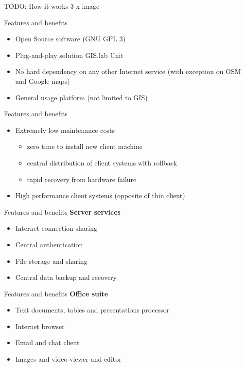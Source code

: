 \documentclass[12pt]{beamer}
\begin{document}
\begin{frame}
	TODO: How it works 3 x image
\end{frame}


\begin{frame}{Features and benefits}
	\begin{itemize}
		\item Open Source software (GNU GPL 3)
		\item Plug-and-play solution GIS.lab Unit
		\item No hard dependency on any other Internet service (with exception on OSM and Google maps)
		\item General usage platform (not limited to GIS)
	\end{itemize}
\end{frame}


\begin{frame}{Features and benefits}
	\begin{itemize}
		\item Extremely low maintenance costs
		\begin{itemize}
			\item zero time to install new client machine
			\item central distribution of client systems with rollback
			\item rapid recovery from hardware failure
		\end{itemize}
		\item High performance client systems (opposite of thin client)
	\end{itemize}
\end{frame}


\begin{frame}{Features and benefits}
	\textbf{Server services}
	\begin{itemize}
		\item Internet connection sharing
		\item Central authentication
		\item File storage and sharing
		\item Central data backup and recovery
	\end{itemize}
\end{frame}


\begin{frame}{Features and benefits}
	\textbf{Office suite}
	\begin{itemize}
		\item Text documents, tables and presentations processor
		\item Internet browser
		\item Email and chat client
		\item Images and video viewer and editor
	\end{itemize}
\end{frame}
\end{document}
